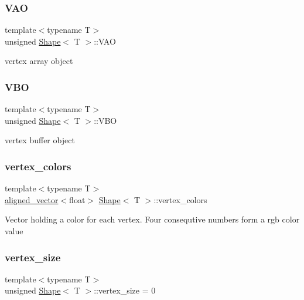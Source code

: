 \subsubsection{\texorpdfstring{V\+AO}{VAO}}
{\footnotesize\ttfamily template$<$typename T$>$ \\
unsigned \mbox{\hyperlink{classShape}{Shape}}$<$ T $>$\+::V\+AO\hspace{0.3cm}{\ttfamily [protected]}}

vertex array object \mbox{\label{classShape_a5ca89aadcd89bb475d6ca88acf733ce6}} 
\subsubsection{\texorpdfstring{V\+BO}{VBO}}
{\footnotesize\ttfamily template$<$typename T$>$ \\
unsigned \mbox{\hyperlink{classShape}{Shape}}$<$ T $>$\+::V\+BO\hspace{0.3cm}{\ttfamily [protected]}}

vertex buffer object \mbox{\label{classShape_a1590ef02d7090f28d1ad312fd46f5030}} 
\subsubsection{\texorpdfstring{vertex\+\_\+colors}{vertex\_colors}}
{\footnotesize\ttfamily template$<$typename T$>$ \\
\mbox{\hyperlink{type__definitions_8hpp_accb98a876f193a416d9c8a02fe22d526}{aligned\+\_\+vector}}$<$float$>$ \mbox{\hyperlink{classShape}{Shape}}$<$ T $>$\+::vertex\+\_\+colors\hspace{0.3cm}{\ttfamily [protected]}}

Vector holding a color for each vertex. Four consequtive numbers form a rgb color value \mbox{\label{classShape_a7cf9cc243cdd64215eca4d81704c7199}} 
\subsubsection{\texorpdfstring{vertex\+\_\+size}{vertex\_size}}
{\footnotesize\ttfamily template$<$typename T$>$ \\
unsigned \mbox{\hyperlink{classShape}{Shape}}$<$ T $>$\+::vertex\+\_\+size = 0\hspace{0.3cm}{\ttfamily [protected]}}

